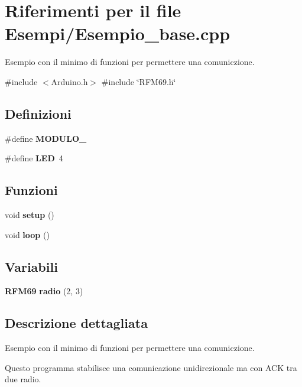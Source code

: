 \section{Riferimenti per il file Esempi/\+Esempio\+\_\+base.cpp}
\label{_esempio__base_8cpp}


Esempio con il minimo di funzioni per permettere una comuniczione.  


{\ttfamily \#include $<$Arduino.\+h$>$}\newline
{\ttfamily \#include \char`\"{}R\+F\+M69.\+h\char`\"{}}\newline
\subsection*{Definizioni}
\begin{DoxyCompactItemize}
\item 
\mbox{\label{_esempio__base_8cpp_a779b99d2a30126dd92f22fea08d7c0f3}} 
\#define {\bfseries M\+O\+D\+U\+L\+O\+\_}
\item 
\mbox{\label{_esempio__base_8cpp_aeb7a7ba1ab7e0406f1b5ab36d579f585}} 
\#define {\bfseries L\+ED}~4
\end{DoxyCompactItemize}
\subsection*{Funzioni}
\begin{DoxyCompactItemize}
\item 
\mbox{\label{_esempio__base_8cpp_a4fc01d736fe50cf5b977f755b675f11d}} 
void {\bfseries setup} ()
\item 
\mbox{\label{_esempio__base_8cpp_afe461d27b9c48d5921c00d521181f12f}} 
void {\bfseries loop} ()
\end{DoxyCompactItemize}
\subsection*{Variabili}
\begin{DoxyCompactItemize}
\item 
\mbox{\label{_esempio__base_8cpp_a2df6ba949dd4ce1e7ee9a96a19aef0fd}} 
\textbf{ R\+F\+M69} {\bfseries radio} (2, 3)
\end{DoxyCompactItemize}


\subsection{Descrizione dettagliata}
Esempio con il minimo di funzioni per permettere una comuniczione. 

Questo programma stabilisce una comunicazione unidirezionale ma con A\+CK tra due radio. 
